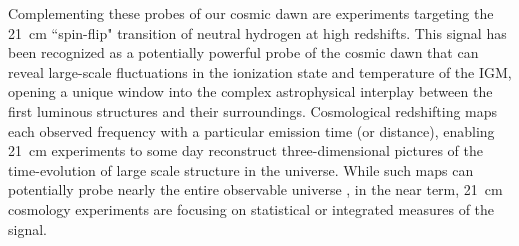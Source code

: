 \documentclass[twocolumn,numberedappendix]{emulateapj} \shorttitle{PSA64}
\begin{document}
Complementing these probes of our cosmic dawn are experiments targeting
the 21~cm ``spin-flip" transition of neutral hydrogen at high redshifts.
This signal has been recognized as a potentially powerful probe
of the cosmic dawn \citep{pritchard_loeb2012,morales_wyithe2010,furlanetto_et_al2006} that can reveal
large-scale fluctuations in the ionization state and temperature of the IGM, opening
a unique window into the complex astrophysical interplay between the first luminous
structures and their surroundings.
Cosmological redshifting maps 
each observed frequency with a particular emission time (or distance), enabling 21~cm experiments 
to some day reconstruct 
three-dimensional pictures of the time-evolution of large scale structure in the universe. 
While such maps can potentially probe nearly the entire observable universe \citep{mao_et_al2008},
in the near term, 21~cm cosmology experiments are focusing on statistical or integrated measures
of the signal.

\end{document}
